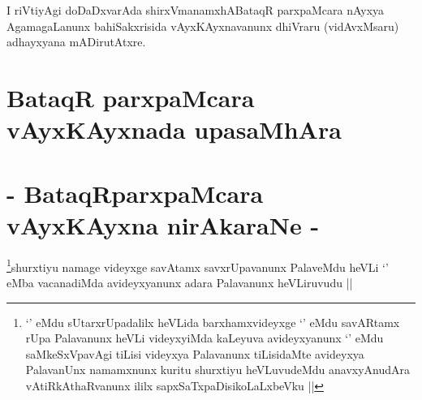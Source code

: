 \begin{artha}
I riVtiyAgi doDaDxvarAda shirxVmanamxhABataqR parxpaMcara nAyxya
AgamagaLanunx bahiSakxrisida vAyxKAyxnavanunx dhiVraru (vidAvxMsaru)
adhayxyana mADirutAtxre.
\end{artha}

\section*{BataqR parxpaMcara vAyxKAyxnada upasaMhAra}

\section*{- BataqRparxpaMcara vAyxKAyxna nirAkaraNe -}

\begin{artha}
\footnote{`\stext' eMdu sUtarxrUpadalilx heVLida barxhamxvideyxge
  `\stext' eMdu savARtamx rUpa Palavanunx heVLi videyxyiMda kaLeyuva
  avideyxyanunx `\stext' eMdu saMkeSxVpavAgi tiLisi videyxya
  Palavanunx tiLisidaMte avideyxya PalavanUnx namamxnunx kuritu
  shurxtiyu heVLuvudeMdu anavxyAnudAra vAtiRkAthaRvanunx ililx
  sapxSaTxpaDisikoLaLxbeVku ||}shurxtiyu namage videyxge savAtamx savxrUpavanunx PalaveMdu
heVLi `\stext' eMba vacanadiMda avideyxyanunx adara Palavanunx
heVLiruvudu ||
\end{artha}

\begin{artha}

\end{artha}

\begin{artha}

\end{artha}

\begin{artha}

\end{artha}

\begin{artha}

\end{artha}

\begin{artha}

\end{artha}

\begin{artha}

\end{artha}

